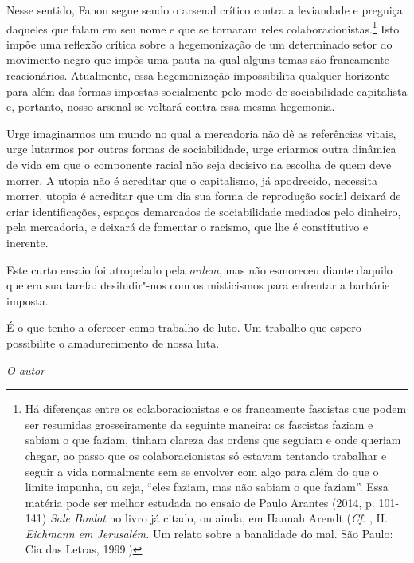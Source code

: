 Nesse sentido, Fanon segue sendo o arsenal crítico contra a leviandade e
preguiça daqueles que falam em seu nome e que se tornaram reles
colaboracionistas.\footnote{Há diferenças entre os colaboracionistas e os
  francamente fascistas que podem ser resumidas grosseiramente da
  seguinte maneira: os fascistas faziam e sabiam o que faziam, tinham
  clareza das ordens que seguiam e onde queriam chegar, ao passo que os
  colaboracionistas só estavam tentando trabalhar e seguir a vida
  normalmente sem se envolver com algo para além do que o limite
  impunha, ou seja, ``eles faziam, mas não sabiam o que faziam''. Essa
  matéria pode ser melhor estudada no ensaio de Paulo Arantes (2014, p.
  101-141) \emph{Sale Boulot} no livro já citado, ou ainda, em Hannah
  Arendt (\emph{Cf}. , H. \emph{Eichmann em Jerusalém.} Um relato sobre a
  banalidade do mal. São Paulo: Cia das Letras, 1999.)} Isto impõe uma
reflexão crítica sobre a hegemonização de um determinado setor do
movimento negro que impôs uma pauta na qual alguns temas são francamente
reacionários. Atualmente, essa hegemonização impossibilita qualquer
horizonte para além das formas impostas socialmente pelo modo de
sociabilidade capitalista e, portanto, nosso arsenal se voltará contra
essa mesma hegemonia.

Urge imaginarmos um mundo no qual a mercadoria não dê as referências
vitais, urge lutarmos por outras formas de sociabilidade, urge criarmos
outra dinâmica de vida em que o componente racial não seja decisivo na
escolha de quem deve morrer. A utopia não é acreditar que o capitalismo,
já apodrecido, necessita morrer, utopia é acreditar que um dia sua forma
de reprodução social deixará de criar identificações, espaços demarcados
de sociabilidade mediados pelo dinheiro, pela mercadoria, e deixará de
fomentar o racismo, que lhe é
constitutivo e inerente.

Este curto ensaio foi atropelado pela \emph{ordem}, mas não esmoreceu
diante daquilo que era sua tarefa: desiludir"-nos com os misticismos para
enfrentar a barbárie imposta.

É o que tenho a oferecer como trabalho de luto. 
Um trabalho que espero possibilite o amadurecimento de nossa luta.
\begin{flushright} 
\emph{O autor}
\end{flushright}

